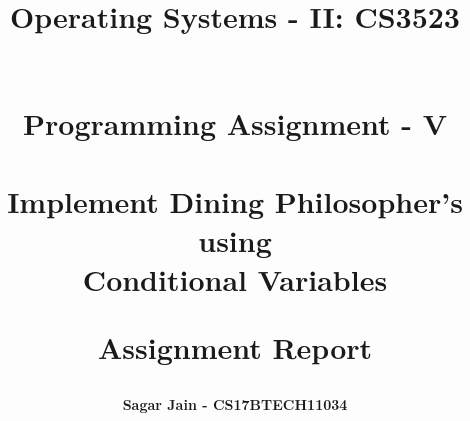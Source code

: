 \documentclass[a4paper,12pt]{report}
\begin{document}
\title{
\textbf{Operating Systems - II: CS3523}\\~\\
\begin{large}
\textbf{Programming Assignment - V\\~\\Implement Dining Philosopher’s using\\Conditional Variables}\\
\end{large}
\begin{large}
\textbf{Assignment Report}
\end{large}
}
\author{\textbf{Sagar Jain - CS17BTECH11034}\\}
\maketitle
\begin{large}
\tableofcontents
\end{large}
\newpage
\end{document}
